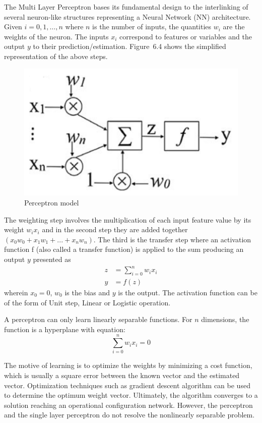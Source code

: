 The Multi Layer Perceptron bases its fundamental design to the
interlinking of several neuron-like structures representing a Neural
Network (NN) architecture. Given $i = 0,1,\ldots,n$ where $n$ is the
number of inputs, the quantities $w_{i}$ are the weights of the
neuron. The inputs $x_{i}$ correspond to features or variables and the
output $y$ to their prediction/estimation. Figure~6.4 shows the
simplified representation of the above steps.

\begin{figure}[h]
\centering
\includegraphics[]{./figures/perceptron.png}
\caption{Perceptron model}
\label{fig1}
\end{figure}

The weighting step involves the multiplication of each input feature
value by its weight ${w_ix_i}$ and in the second step they are added
together $(x_{0}w_{0} + x_{1}w_{1} + ... + x_{n}w_{n})$. The third is
the transfer step where an activation function f (also called a
transfer function) is applied to the sum producing an output $y$
presented as
\begin{align*}
  z & = \sum_{i=0}^{n} w_{i}x_{i}\\
  y & = f(z)
\end{align*}
wherein $x_{0} = 0$, $w_{0}$ is the bias and $y$ is the output. The
activation function can be of the form of Unit step, Linear or
Logistic operation.

A perceptron can only learn linearly separable functions. For $n$
dimensions, the function is a hyperplane with equation:
\begin{equation}
    \sum_{i=0}^{n} w_{i}x_{i} = 0
\end{equation}

The motive of learning is to optimize the weights by minimizing a cost
function, which is usually a square error between the known vector and
the estimated vector. Optimization techniques such as gradient descent
algorithm can be used to determine the optimum weight
vector. Ultimately, the algorithm converges to a solution reaching an
operational configuration network. However, the perceptron and the
single layer perceptron do not resolve the nonlinearly separable
problem.

